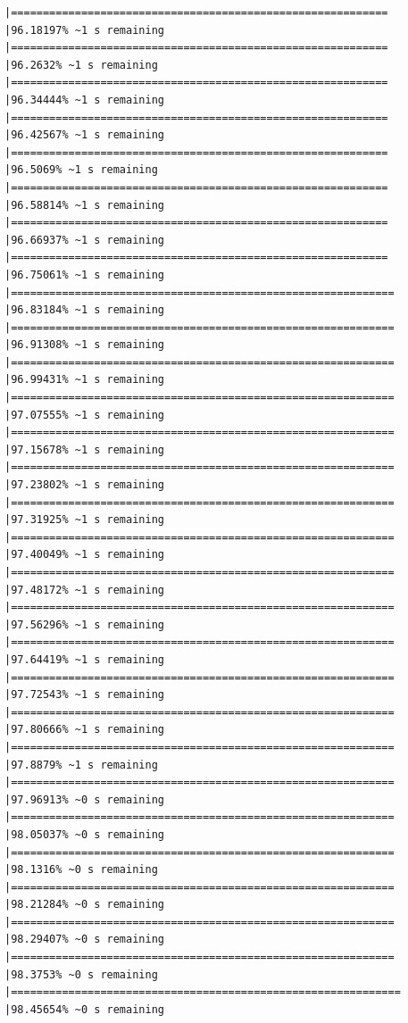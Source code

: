 \documentclass{article}\usepackage[]{graphicx}\usepackage[]{xcolor}
\makeatletter
\newenvironment{kframe}{%
 \def\at@end@of@kframe{}%
 \ifinner\ifhmode%
  \def\at@end@of@kframe{\end{minipage}}%
  \begin{minipage}{\columnwidth}%
 \fi\fi%
 \def\FrameCommand##1{\hskip\@totalleftmargin \hskip-\fboxsep
 \colorbox{shadecolor}{##1}\hskip-\fboxsep
     \hskip-\linewidth \hskip-\@totalleftmargin \hskip\columnwidth}%
 \MakeFramed {\advance\hsize-\width
   \@totalleftmargin\z@ \linewidth\hsize
   \@setminipage}}%
 {\par\unskip\endMakeFramed%
 \at@end@of@kframe}
\newenvironment{knitrout}{}{} %
\makeatother
\begin{document}
\begin{knitrout}
\begin{kframe}
\begin{verbatim}
|===========================================================   |96.18197% ~1 s remaining  
|===========================================================   |96.2632% ~1 s remaining   
|===========================================================   |96.34444% ~1 s remaining  
|===========================================================   |96.42567% ~1 s remaining  
|===========================================================   |96.5069% ~1 s remaining   
|===========================================================   |96.58814% ~1 s remaining  
|===========================================================   |96.66937% ~1 s remaining  
|===========================================================   |96.75061% ~1 s remaining  
|============================================================  |96.83184% ~1 s remaining  
|============================================================  |96.91308% ~1 s remaining  
|============================================================  |96.99431% ~1 s remaining  
|============================================================  |97.07555% ~1 s remaining  
|============================================================  |97.15678% ~1 s remaining  
|============================================================  |97.23802% ~1 s remaining  
|============================================================  |97.31925% ~1 s remaining  
|============================================================  |97.40049% ~1 s remaining  
|============================================================  |97.48172% ~1 s remaining  
|============================================================  |97.56296% ~1 s remaining  
|============================================================  |97.64419% ~1 s remaining  
|============================================================  |97.72543% ~1 s remaining  
|============================================================  |97.80666% ~1 s remaining  
|============================================================  |97.8879% ~1 s remaining   
|============================================================  |97.96913% ~0 s remaining  
|============================================================  |98.05037% ~0 s remaining  
|============================================================  |98.1316% ~0 s remaining   
|============================================================  |98.21284% ~0 s remaining  
|============================================================  |98.29407% ~0 s remaining  
|============================================================  |98.3753% ~0 s remaining   
|============================================================= |98.45654% ~0 s remaining  

\end{verbatim}
\end{kframe}
\end{knitrout}
\end{document}
